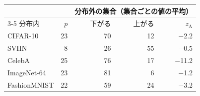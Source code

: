 \documentclass[border=3pt]{standalone}
\begin{document}
%
\begin{tabular}{lrrrr}%
\toprule
 & & \multicolumn{3}{c}{分布外の集合（集合ごとの値の平均）}\\
\cmidrule(lr){3-5}
分布内 & $p$ & 下がる & 上がる & $z_{\mathrm{A}}$\\
\midrule
CIFAR-10 & 23 & 70 & 12 & $-$2.2\\
SVHN & 8 & 26 & 55 & $-$0.5\\
CelebA & 25 & 76 & 17 & $-$11.2\\
ImageNet-64 & 23 & 81 & 6 & $-$1.2\\
FashionMNIST & 22 & 59 & 24 & $-$3.2\\
\bottomrule
\end{tabular}%
\end{document}
